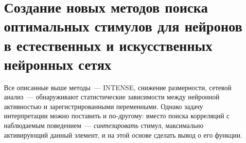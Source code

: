 \section{Создание новых методов поиска оптимальных стимулов для нейронов в естественных и искусственных нейронных сетях}\label{sec:mango}


Все описанные выше методы~--- INTENSE, снижение размерности, сетевой анализ~--- обнаруживают статистические зависимости между нейронной активностью и зарегистрированными переменными. Однако задачу интерпретации можно поставить и по-другому: вместо поиска корреляций с наблюдаемым поведением~--- \textit{синтезировать} стимул, максимально активирующий данный элемент, и на этой основе сделать вывод о его функции.











\clearpage
